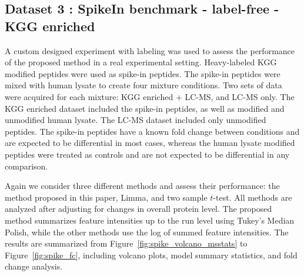 \documentclass{mcp}
\def\sfigref#1{{Figure~\ref{#1}}}
\begin{document}
\clearpage
\subsection{Dataset 3 : SpikeIn benchmark - label-free - KGG enriched}
\label{sec:benchmark}

A custom designed experiment with labeling was used to assess the performance of the proposed method in a real experimental setting. Heavy-labeled KGG modified peptides were used as spike-in peptides. The spike-in peptides were mixed with human lysate to create four mixture conditions. Two sets of data were acquired for each mixture: KGG enriched + LC-MS, and LC-MS only. The KGG enriched dataset included the spike-in peptides, as well as modified and unmodified human lysate. The LC-MS dataset included only unmodified peptides. The spike-in peptides have a known fold change between conditions and are expected to be differential in most cases, whereas the human lysate modified peptides were treated as controls and are not expected to be differential in any comparison.

Again we consider three different methods and assess their performance: the method proposed in this paper, Limma, and two sample $t$-test. All methods are analyzed after adjusting for changes in overall protein level. The proposed method summarizes feature intensities up to the run level using Tukey's Median Polish, while the other methods use the log of summed feature intensities. The results are summarized from \sfigref{fig:spike_volcano_msstats} to \sfigref{fig:spike_fc}, including volcano plots, model summary statistics, and fold change analysis.
\end{document}
